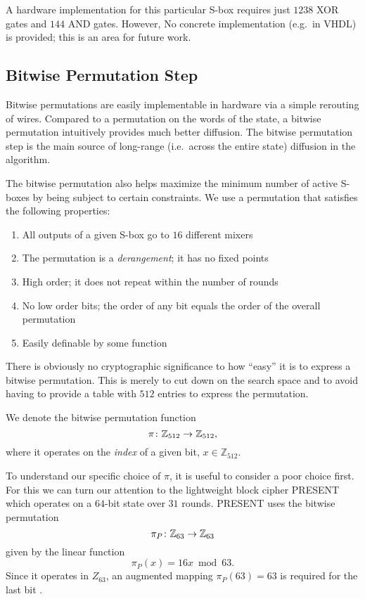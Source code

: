 A hardware implementation for this particular S-box requires just $1238$ XOR gates and $144$ AND gates.
However, No concrete implementation (e.g.\ in VHDL) is provided; this is an area for future work.

\subsection{Bitwise Permutation Step}
Bitwise permutations are easily implementable in hardware via a simple rerouting of wires.
Compared to a permutation on the words of the state, a bitwise permutation intuitively provides much better diffusion.
The bitwise permutation step is the main source of long-range (i.e.\ across the entire state) diffusion in the algorithm.

The bitwise permutation also helps maximize the minimum number of active S-boxes by being subject to certain constraints.
We use a permutation that satisfies the following properties:
\begin{enumerate}
\item All outputs of a given S-box go to $16$ different mixers
\item The permutation is a \emph{derangement}; it has no fixed points
\item High order; it does not repeat within the number of rounds
\item No low order bits; the order of any bit equals the order of the overall permutation
\item Easily definable by some function
\end{enumerate}
There is obviously no cryptographic significance to how ``easy'' it is to express a bitwise permutation.
This is merely to cut down on the search space and to avoid having to provide a table with $512$ entries to express the permutation.

We denote the bitwise permutation function
\begin{equation*}
\pi \colon \mathbb{Z}_{512} \rightarrow \mathbb{Z}_{512},
\end{equation*}
where it operates on the \emph{index} of a given bit, $x \in \mathbb{Z}_{512}$. 

To understand our specific choice of $\pi$, it is useful to consider a poor choice first.
For this we can turn our attention to the lightweight block cipher PRESENT which operates on a $64$-bit state over $31$ rounds.
PRESENT uses the bitwise permutation
\begin{equation*}
\pi_P \colon \mathbb{Z}_{63} \rightarrow \mathbb{Z}_{63}
\end{equation*}
given by the linear function
\begin{equation*}
\pi_P(x) = 16x \bmod{63}.
\end{equation*}
Since it operates in $Z_{63}$, an augmented mapping $\pi_P(63) = 63$ is required for the last bit \cite{Bogdanov2007_PRESENT}.

